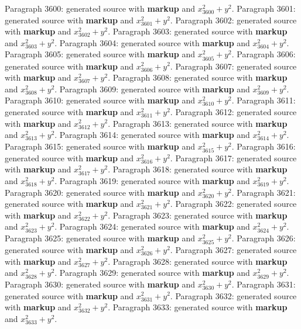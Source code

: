 \documentclass{article}
\begin{document}
Paragraph 3600: generated source with \textbf{markup} and $x_{3600}^2 + y^2$.
Paragraph 3601: generated source with \textbf{markup} and $x_{3601}^2 + y^2$.
Paragraph 3602: generated source with \textbf{markup} and $x_{3602}^2 + y^2$.
Paragraph 3603: generated source with \textbf{markup} and $x_{3603}^2 + y^2$.
Paragraph 3604: generated source with \textbf{markup} and $x_{3604}^2 + y^2$.
Paragraph 3605: generated source with \textbf{markup} and $x_{3605}^2 + y^2$.
Paragraph 3606: generated source with \textbf{markup} and $x_{3606}^2 + y^2$.
Paragraph 3607: generated source with \textbf{markup} and $x_{3607}^2 + y^2$.
Paragraph 3608: generated source with \textbf{markup} and $x_{3608}^2 + y^2$.
Paragraph 3609: generated source with \textbf{markup} and $x_{3609}^2 + y^2$.
Paragraph 3610: generated source with \textbf{markup} and $x_{3610}^2 + y^2$.
Paragraph 3611: generated source with \textbf{markup} and $x_{3611}^2 + y^2$.
Paragraph 3612: generated source with \textbf{markup} and $x_{3612}^2 + y^2$.
Paragraph 3613: generated source with \textbf{markup} and $x_{3613}^2 + y^2$.
Paragraph 3614: generated source with \textbf{markup} and $x_{3614}^2 + y^2$.
Paragraph 3615: generated source with \textbf{markup} and $x_{3615}^2 + y^2$.
Paragraph 3616: generated source with \textbf{markup} and $x_{3616}^2 + y^2$.
Paragraph 3617: generated source with \textbf{markup} and $x_{3617}^2 + y^2$.
Paragraph 3618: generated source with \textbf{markup} and $x_{3618}^2 + y^2$.
Paragraph 3619: generated source with \textbf{markup} and $x_{3619}^2 + y^2$.
Paragraph 3620: generated source with \textbf{markup} and $x_{3620}^2 + y^2$.
Paragraph 3621: generated source with \textbf{markup} and $x_{3621}^2 + y^2$.
Paragraph 3622: generated source with \textbf{markup} and $x_{3622}^2 + y^2$.
Paragraph 3623: generated source with \textbf{markup} and $x_{3623}^2 + y^2$.
Paragraph 3624: generated source with \textbf{markup} and $x_{3624}^2 + y^2$.
Paragraph 3625: generated source with \textbf{markup} and $x_{3625}^2 + y^2$.
Paragraph 3626: generated source with \textbf{markup} and $x_{3626}^2 + y^2$.
Paragraph 3627: generated source with \textbf{markup} and $x_{3627}^2 + y^2$.
Paragraph 3628: generated source with \textbf{markup} and $x_{3628}^2 + y^2$.
Paragraph 3629: generated source with \textbf{markup} and $x_{3629}^2 + y^2$.
Paragraph 3630: generated source with \textbf{markup} and $x_{3630}^2 + y^2$.
Paragraph 3631: generated source with \textbf{markup} and $x_{3631}^2 + y^2$.
Paragraph 3632: generated source with \textbf{markup} and $x_{3632}^2 + y^2$.
Paragraph 3633: generated source with \textbf{markup} and $x_{3633}^2 + y^2$.
\end{document}
